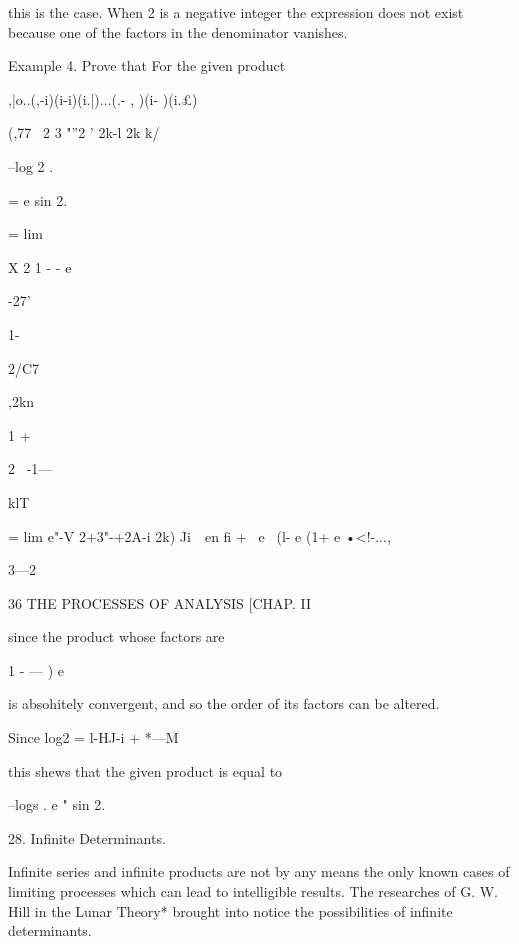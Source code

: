 this is the case. When 2 is a negative integer the expression does not
exist because one of the factors in the denominator vanishes.



Example 4. Prove that For the given product

,|o..(,-i)(i-i)(i.|)...(.- , )(i- )(i.£)

(,77 \ 2 3 "''2 ' 2k-l 2k k/



--log 2 .

= e sin 2.



= lim



X 2 1 - - e



 -27'



1-



2/C7



,2kn



1 +



2 \ -1—



klT



= lim e"-V 2+3"-+2A-i 2k) Ji\ \ en fi + \ e~ (l- e (1+ e •<!-...,



3—2



36 THE PROCESSES OF ANALYSIS [CHAP. II

since the product whose factors are



1 - — ) e



is absohitely convergent, and so the order of its factors can be
altered.

Since log2 = l-HJ-i + *---M

this shews that the given product is equal to



--logs . e " sin 2.



28. Infinite Determinants.

Infinite series and infinite products are not by any means the only
known cases of limiting processes which can lead to intelligible
results. The researches of G. W. Hill in the Lunar Theory* brought
into notice the possibilities of infinite determinants.

